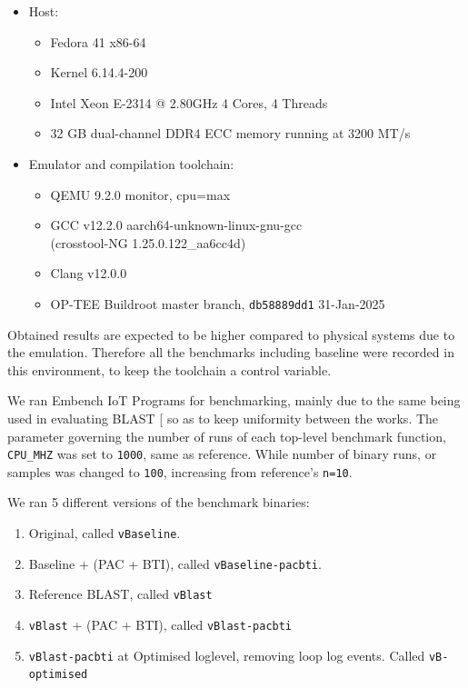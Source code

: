 \documentclass[a4paper, nobind]{templates/ociamthesis}
\providecommand{\tightlist}{%
  \setlength{\itemsep}{0pt}\setlength{\parskip}{0pt}}
\begin{document}
\begin{itemize}
\tightlist
\item
  Host:

  \begin{itemize}
  \tightlist
  \item
    Fedora 41 x86-64
  \item
    Kernel 6.14.4-200
  \item
    Intel Xeon E-2314 @ 2.80GHz 4 Cores, 4 Threads
  \item
    32 GB dual-channel DDR4 ECC memory running at 3200 MT/s
  \end{itemize}
\item
  Emulator and compilation toolchain:

  \begin{itemize}
  \tightlist
  \item
    QEMU 9.2.0 monitor, cpu=max
  \item
    GCC v12.2.0 aarch64-unknown-linux-gnu-gcc\\
    (crosstool-NG 1.25.0.122\_aa6cc4d)
  \item
    Clang v12.0.0
  \item
    OP-TEE Buildroot master branch, \texttt{db58889dd1} 31-Jan-2025
  \end{itemize}
\end{itemize}

Obtained results are expected to be higher compared to physical systems due to
the emulation. Therefore all the benchmarks including baseline were recorded in
this environment, to keep the toolchain a control variable.

We ran Embench IoT Programs for benchmarking, mainly due to the same being used in
evaluating BLAST {[}\citeproc{ref-blast}{56}{]} so as to keep uniformity between the works.
The parameter governing the number of runs of each top-level benchmark function,
\texttt{CPU\_MHZ} was set to \texttt{1000}, same as reference. While number of binary runs, or samples
was changed to \texttt{100}, increasing from reference's \texttt{n=10}.

We ran 5 different versions of the benchmark binaries:

\begin{enumerate}
\def\labelenumi{\arabic{enumi}.}
\tightlist
\item
  Original, called \texttt{vBaseline}.
\item
  Baseline + (PAC + BTI), called \texttt{vBaseline-pacbti}.
\item
  Reference BLAST, called \texttt{vBlast}
\item
  \texttt{vBlast} + (PAC + BTI), called \texttt{vBlast-pacbti}
\item
  \texttt{vBlast-pacbti} at Optimised loglevel, removing loop log events. Called \texttt{vB-optimised}
\end{enumerate}
\end{document}
